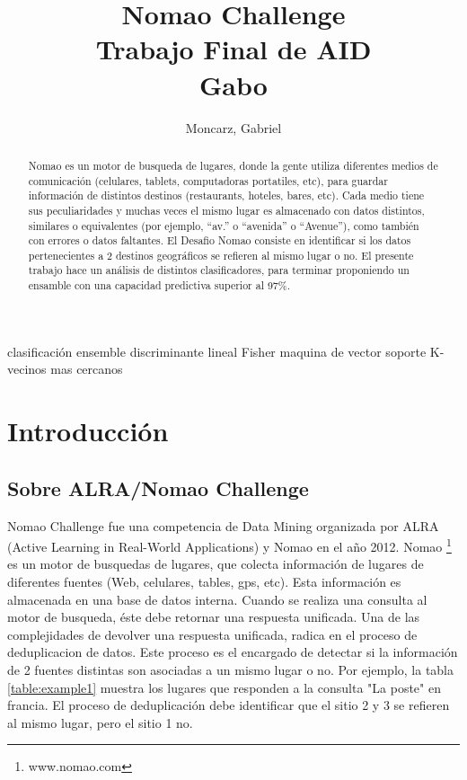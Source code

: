 \documentclass[journal]{IEEEtran}
\begin{document}
\title{  Nomao Challenge \\
	{\large Trabajo Final de AID} \\
	{\large Gabo}
} 
\author{Moncarz, Gabriel}
\maketitle %


\begin{abstract}
Nomao es un motor de busqueda de lugares, donde la gente utiliza diferentes medios
de comunicación (celulares, tablets, computadoras portatiles, etc), 
para guardar información de distintos destinos (restaurants, hoteles,
bares, etc). Cada medio tiene sus peculiaridades y muchas veces el mismo lugar
es almacenado con datos distintos, similares o equivalentes (por ejemplo, ``av.'' o
``avenida'' o ``Avenue''), como también con errores o datos faltantes. 
El Desafio Nomao consiste en identificar si los datos pertenecientes
a 2 destinos geográficos se refieren al mismo lugar o no. El presente
trabajo hace un análisis de distintos clasificadores, para terminar
proponiendo un ensamble con una capacidad predictiva superior al 97\%.
\end{abstract}

\begin{IEEEkeywords}
clasificación ensemble discriminante lineal Fisher maquina de vector soporte
K-vecinos mas cercanos
\end{IEEEkeywords}


\section{Introducción}

\subsection{Sobre ALRA/Nomao Challenge}
Nomao Challenge fue una competencia de Data Mining organizada por ALRA 
(Active Learning in Real-World Applications) y Nomao en el año 2012. Nomao 
\footnote{www.nomao.com} es un motor de busquedas de lugares, que colecta
información de lugares de diferentes fuentes (Web, celulares, tables, gps, 
etc). Esta información es almacenada en una base de datos interna. 
Cuando se realiza una consulta al motor de busqueda, éste debe retornar una
respuesta unificada. Una de las complejidades de devolver una
respuesta unificada, radica en el proceso de deduplicacion de datos. Este
proceso es el encargado de detectar si la información de 2 fuentes distintas
son asociadas a un mismo lugar o no. Por ejemplo, la tabla \ref{table:example1}
muestra los lugares que responden a la consulta "La poste" en francia. El
proceso de deduplicación debe identificar que el sitio 2 y 3 se refieren
al mismo lugar, pero el sitio 1 no.
\end{document}
